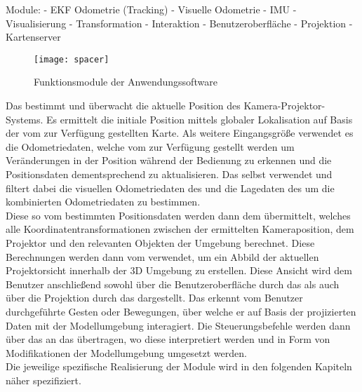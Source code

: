Module: \mLocalization - EKF Odometrie (Tracking) - Visuelle Odometrie - IMU - Visualisierung - Transformation - Interaktion - Benutzeroberfläche - Projektion - Kartenserver

\begin{figure}[ht]
	\begin{center}
		\texttt{[image: spacer]}
		\caption{Funktionsmodule der Anwendungssoftware}
		\label{fig.modules}
	\end{center}
\end{figure}

Das \mLocalization bestimmt und überwacht die aktuelle Position des Kamera-Projektor-Systems. Es ermittelt die initiale Position mittels globaler Lokalisation auf Basis der vom \mMapserver zur Verfügung gestellten Karte. Als weitere Eingangsgröße verwendet es die Odometriedaten, welche vom \mEkf zur Verfügung gestellt werden um Veränderungen in der Position während der Bedienung zu erkennen und die Positionsdaten dementsprechend zu aktualisieren. Das \mEkf selbst verwendet und filtert dabei die visuellen Odometriedaten des \mFovis und die Lagedaten des \mImu {} um die kombinierten Odometriedaten zu bestimmen.\\
Diese so vom \mLocalization bestimmten Positionsdaten werden dann dem \mTransformation übermittelt, welches alle Koordinatentransformationen zwischen der ermittelten Kameraposition, dem Projektor und den relevanten Objekten der Umgebung berechnet. Diese Berechnungen werden dann vom \mVisualization verwendet, um ein Abbild der aktuellen Projektorsicht innerhalb der 3D Umgebung zu erstellen. Diese Ansicht wird dem Benutzer anschließend sowohl über die Benutzeroberfläche durch das \mGui als auch über die Projektion durch das \mProjection dargestellt. Das \mInteraction erkennt vom Benutzer durchgeführte Gesten oder Bewegungen, über welche er auf Basis der projizierten Daten mit der Modellumgebung interagiert. Die Steuerungsbefehle werden dann über das \mTransformation an das \mVisualization übertragen, wo diese interpretiert werden und in Form von Modifikationen der Modellumgebung umgesetzt werden.\\
Die jeweilige spezifische Realisierung der Module wird in den folgenden Kapiteln näher spezifiziert.
